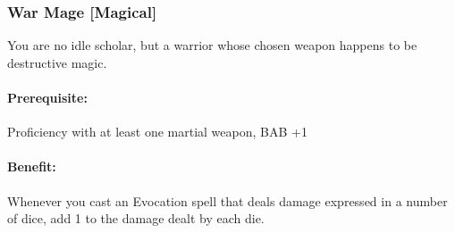 \subsubsection[War Mage]{War Mage [Magical]}
\label{Feat:WarMage}
You are no idle scholar, but a warrior whose chosen weapon happens to be destructive magic.

\paragraph{Prerequisite:} Proficiency with at least one martial weapon, BAB +1

\paragraph{Benefit:} Whenever you cast an Evocation spell that deals damage expressed in a number of dice, add 1 to the damage dealt by each die. 